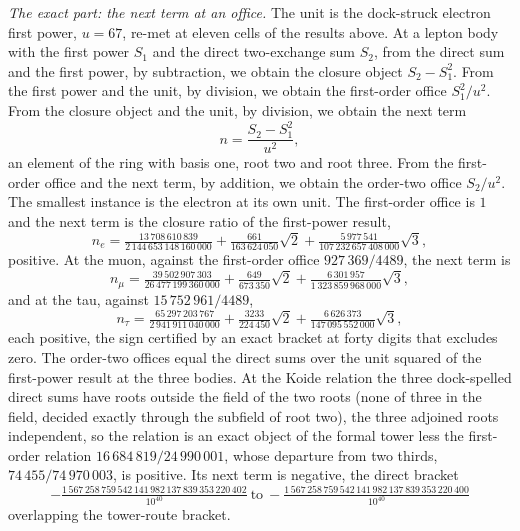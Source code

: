 \begin{chproof}
\textit{The exact part: the next term at an office.} The unit is the dock-struck electron first power, $u=67$, re-met at eleven cells of the results above. At a lepton body with the first power $S_1$ and the direct two-exchange sum $S_2$, from the direct sum and the first power, by subtraction, we obtain the closure object $S_2-S_1^{2}$. From the first power and the unit, by division, we obtain the first-order office $S_1^{2}/u^{2}$. From the closure object and the unit, by division, we obtain the next term
\begin{equation}
n=\frac{S_2-S_1^{2}}{u^{2}} ,
\end{equation}
an element of the ring with basis one, root two and root three. From the first-order office and the next term, by addition, we obtain the order-two office $S_2/u^{2}$. The smallest instance is the electron at its own unit. The first-order office is $1$ and the next term is the closure ratio of the first-power result,
\begin{equation}
n_{e}=\tfrac{13\,708\,610\,839}{2\,144\,653\,148\,160\,000}+\tfrac{661}{163\,624\,050}\sqrt{2}+\tfrac{5\,977\,541}{107\,232\,657\,408\,000}\sqrt{3},
\end{equation}
positive. At the muon, against the first-order office $927\,369/4489$, the next term is
\begin{equation}
n_{\mu}=\tfrac{39\,502\,907\,303}{26\,477\,199\,360\,000}+\tfrac{649}{673\,350}\sqrt{2}+\tfrac{6\,301\,957}{1\,323\,859\,968\,000}\sqrt{3},
\end{equation}
and at the tau, against $15\,752\,961/4489$,
\begin{equation}
n_{\tau}=\tfrac{65\,297\,203\,767}{2\,941\,911\,040\,000}+\tfrac{3233}{224\,450}\sqrt{2}+\tfrac{6\,626\,373}{147\,095\,552\,000}\sqrt{3},
\end{equation}
each positive, the sign certified by an exact bracket at forty digits that excludes zero. The order-two offices equal the direct sums over the unit squared of the first-power result at the three bodies. At the Koide relation the three dock-spelled direct sums have roots outside the field of the two roots (none of three in the field, decided exactly through the subfield of root two), the three adjoined roots independent, so the relation is an exact object of the formal tower less the first-order relation $16\,684\,819/24\,990\,001$, whose departure from two thirds, $74\,455/74\,970\,003$, is positive. Its next term is negative, the direct bracket
\begin{equation}
-\tfrac{1\,567\,258\,759\,542\,141\,982\,137\,839\,353\,220\,402}{10^{40}}\ \text{to}\ -\tfrac{1\,567\,258\,759\,542\,141\,982\,137\,839\,353\,220\,400}{10^{40}}
\end{equation}
overlapping the tower-route bracket.


\end{chproof}
